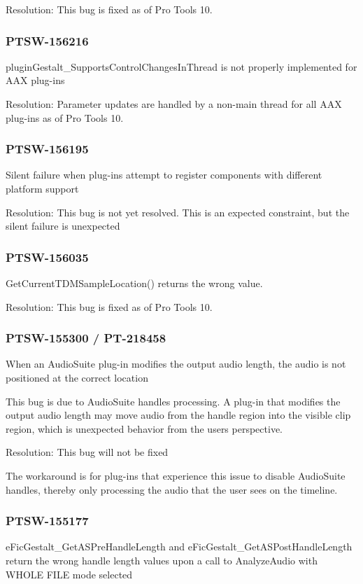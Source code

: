 Resolution\+: This bug is fixed as of Pro Tools 10.\hypertarget{a00374_PTSW-156216}{}\subsubsection{P\+T\+S\+W-\/156216}\label{a00374_PTSW-156216}
{\ttfamily plugin\+Gestalt\+\_\+\+Supports\+Control\+Changes\+In\+Thread} is not properly implemented for A\+A\+X plug-\/ins

Resolution\+: Parameter updates are handled by a non-\/main thread for all A\+A\+X plug-\/ins as of Pro Tools 10.\hypertarget{a00374_PTSW-156195}{}\subsubsection{P\+T\+S\+W-\/156195}\label{a00374_PTSW-156195}
Silent failure when plug-\/ins attempt to register components with different platform support

Resolution\+: This bug is not yet resolved. This is an expected constraint, but the silent failure is unexpected\hypertarget{a00374_PTSW-156035}{}\subsubsection{P\+T\+S\+W-\/156035}\label{a00374_PTSW-156035}
{\ttfamily Get\+Current\+T\+D\+M\+Sample\+Location()} returns the wrong value.

Resolution\+: This bug is fixed as of Pro Tools 10.\hypertarget{a00374_PTSW-155300}{}\subsubsection{P\+T\+S\+W-\/155300 / P\+T-\/218458}\label{a00374_PTSW-155300}
When an Audio\+Suite plug-\/in modifies the output audio length, the audio is not positioned at the correct location

This bug is due to Audio\+Suite handles processing. A plug-\/in that modifies the output audio length may move audio from the handle region into the visible clip region, which is unexpected behavior from the user\textquotesingle{}s perspective.

Resolution\+: This bug will not be fixed

The workaround is for plug-\/ins that experience this issue to disable Audio\+Suite handles, thereby only processing the audio that the user sees on the timeline.\hypertarget{a00374_PTSW-155177}{}\subsubsection{P\+T\+S\+W-\/155177}\label{a00374_PTSW-155177}
{\ttfamily e\+Fic\+Gestalt\+\_\+\+Get\+A\+S\+Pre\+Handle\+Length} and {\ttfamily e\+Fic\+Gestalt\+\_\+\+Get\+A\+S\+Post\+Handle\+Length} return the wrong handle length values upon a call to {\ttfamily Analyze\+Audio} with \textquotesingle{}W\+H\+O\+L\+E F\+I\+L\+E\textquotesingle{} mode selected

